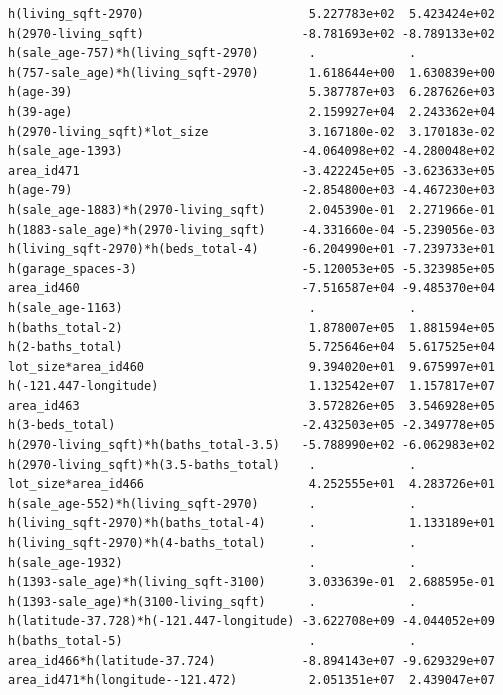 \documentclass[
]{article}
\begin{document}
\begin{verbatim}
h(living_sqft-2970)                       5.227783e+02  5.423424e+02
h(2970-living_sqft)                      -8.781693e+02 -8.789133e+02
h(sale_age-757)*h(living_sqft-2970)       .             .           
h(757-sale_age)*h(living_sqft-2970)       1.618644e+00  1.630839e+00
h(age-39)                                 5.387787e+03  6.287626e+03
h(39-age)                                 2.159927e+04  2.243362e+04
h(2970-living_sqft)*lot_size              3.167180e-02  3.170183e-02
h(sale_age-1393)                         -4.064098e+02 -4.280048e+02
area_id471                               -3.422245e+05 -3.623633e+05
h(age-79)                                -2.854800e+03 -4.467230e+03
h(sale_age-1883)*h(2970-living_sqft)      2.045390e-01  2.271966e-01
h(1883-sale_age)*h(2970-living_sqft)     -4.331660e-04 -5.239056e-03
h(living_sqft-2970)*h(beds_total-4)      -6.204990e+01 -7.239733e+01
h(garage_spaces-3)                       -5.120053e+05 -5.323985e+05
area_id460                               -7.516587e+04 -9.485370e+04
h(sale_age-1163)                          .             .           
h(baths_total-2)                          1.878007e+05  1.881594e+05
h(2-baths_total)                          5.725646e+04  5.617525e+04
lot_size*area_id460                       9.394020e+01  9.675997e+01
h(-121.447-longitude)                     1.132542e+07  1.157817e+07
area_id463                                3.572826e+05  3.546928e+05
h(3-beds_total)                          -2.432503e+05 -2.349778e+05
h(2970-living_sqft)*h(baths_total-3.5)   -5.788990e+02 -6.062983e+02
h(2970-living_sqft)*h(3.5-baths_total)    .             .           
lot_size*area_id466                       4.252555e+01  4.283726e+01
h(sale_age-552)*h(living_sqft-2970)       .             .           
h(living_sqft-2970)*h(baths_total-4)      .             1.133189e+01
h(living_sqft-2970)*h(4-baths_total)      .             .           
h(sale_age-1932)                          .             .           
h(1393-sale_age)*h(living_sqft-3100)      3.033639e-01  2.688595e-01
h(1393-sale_age)*h(3100-living_sqft)      .             .           
h(latitude-37.728)*h(-121.447-longitude) -3.622708e+09 -4.044052e+09
h(baths_total-5)                          .             .           
area_id466*h(latitude-37.724)            -8.894143e+07 -9.629329e+07
area_id471*h(longitude--121.472)          2.051351e+07  2.439047e+07
                                                                    

\end{verbatim}
\end{document}

